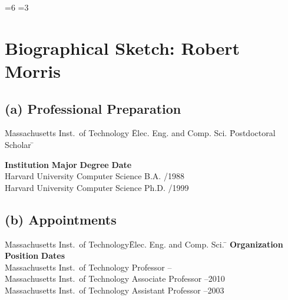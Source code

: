 \documentclass{article}
\begin{document}
=6 %
=3 %
\section*{Biographical Sketch: Robert Morris}

\subsection*{(a) Professional Preparation}

\begin{tabbing}
Massachusetts Inst.\ of Technology \quad \=
    Elec. Eng. and Comp. Sci. \quad \=
    Postdoctoral Scholar \quad \=
    \kill

\textbf{Institution} \> \textbf{Major} \> \textbf{Degree} \> \textbf{Date} \\
Harvard University \> Computer Science \> B.A. /1988 \\
Harvard University \> Computer Science \> Ph.D. /1999 \\
\end{tabbing}

\subsection*{(b) Appointments}

\begin{tabbing}
Massachusetts Inst.\ of Technology\quad \=
    Elec. Eng. and Comp. Sci. \quad \=
    \kill
\textbf{Organization}\> \textbf{Position}\> \textbf{Dates}\\

Massachusetts Inst.\ of Technology \> Professor -- \\
Massachusetts Inst.\ of Technology \> Associate Professor --2010 \\
Massachusetts Inst.\ of Technology \> Assistant Professor --2003 \\

\end{tabbing}

\end{document}
